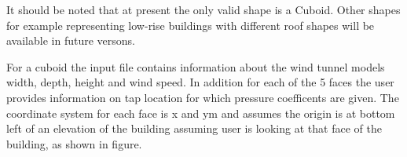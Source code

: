 It should be noted that at present the only valid shape is a Cuboid. Other shapes for example representing low-rise buildings with different roof shapes will be available in future versons.

For a cuboid the input file contains information about the wind tunnel models width, depth, height and wind speed. In addition for each of the 5 faces the user provides information on tap location for which pressure coefficents are given. The coordinate system for each face is x and ym and assumes the origin is at bottom left of an elevation of the building assuming user is looking at that face of the building, as shown in figure.





